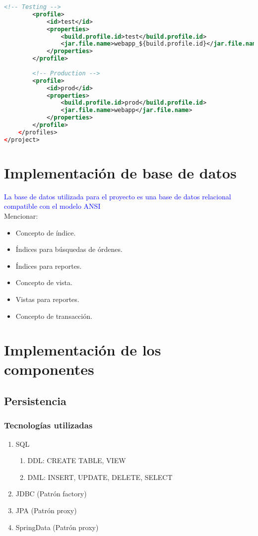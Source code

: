 \begin{lstlisting}[language=XML, caption={Configuración de la aplicación web}, label={lst:maven-spring-boot-webapp}]
		<!-- Testing -->
		<profile>
			<id>test</id>
			<properties>
				<build.profile.id>test</build.profile.id>
				<jar.file.name>webapp_${build.profile.id}</jar.file.name>
			</properties>
		</profile>
		
		<!-- Production -->
		<profile>
			<id>prod</id>
			<properties>
				<build.profile.id>prod</build.profile.id>
				<jar.file.name>webapp</jar.file.name>
			</properties>
		</profile>
	</profiles>
</project>	
\end{lstlisting}


\section{Implementación de base de datos}
\textcolor{blue}{La base de datos utilizada para el proyecto es una base de datos relacional compatible con el modelo ANSI}\\
Mencionar: 
\begin{itemize}
	\item Concepto de índice.
	\item Índices para búsquedas de órdenes.
	\item Índices para reportes.
	\item Concepto de vista.
	\item Vistas para reportes.
	\item Concepto de transacción.
\end{itemize}


\section{Implementación de los componentes}

\subsection{Persistencia}
\subsubsection{Tecnologías utilizadas}
\begin{enumerate}
	\item SQL 
		\begin{enumerate}
			\item DDL: CREATE TABLE, VIEW
			\item DML: INSERT, UPDATE, DELETE, SELECT
		\end{enumerate}
	\item JDBC 			(Patrón factory)
	\item JPA			(Patrón proxy)
	\item SpringData	(Patrón proxy)
\end{enumerate}

